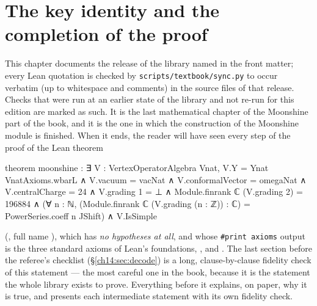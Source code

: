 \chapter{The key identity and the completion of the proof}\label{ch:14}

\providecommand{\chXIVsig}{\sigma^{\natural}}
\providecommand{\chXIVA}{V_0^{+}}
\providecommand{\chXIVB}{V_3^{+}}

This chapter documents the release of the library named in the front matter; every Lean quotation is checked by \texttt{scripts/textbook/sync.py} to occur verbatim (up to whitespace and comments) in the source files of that release. Checks that were run at an earlier state of the library and not re-run for this edition are marked as such.  It is the last mathematical chapter of the Moonshine part of the book, and it is the one in which the construction
of the Moonshine module is finished.  When it ends, the reader will have seen every step of the
proof of the Lean theorem
\begin{leancode}
theorem moonshine :
    ∃ V : VertexOperatorAlgebra Vnat,
      V.Y = Ynat VnatAxioms.wbarL ∧ V.vacuum = vacNat ∧ V.conformalVector = omegaNat ∧
      V.centralCharge = 24 ∧
      V.grading 1 = ⊥ ∧
      Module.finrank ℂ (V.grading 2) = 196884 ∧
      (∀ n : ℕ, (Module.finrank ℂ (V.grading (n : ℤ)) : ℂ) = PowerSeries.coeff n JShift) ∧
      V.IsSimple
\end{leancode}
(, full name ), which has
\emph{no hypotheses at all}, and whose \texttt{\#print axioms} output is the three standard axioms
of Lean's foundations, ,  and .  The last
section before the referee's checklist (\S\ref{ch14:sec:decode}) is a long, clause-by-clause
fidelity check of this statement — the most careful one in the book, because it is the statement
the whole library exists to prove.  Everything before it explains, on paper, why it is true, and
presents each intermediate statement with its own fidelity check.

